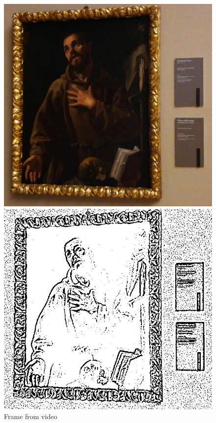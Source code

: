 \begin{figure}[h]
      \includegraphics[width=\linewidth]{pictures/painting_detection/Frame.png}
      \caption*{Frame from video}\label{fig:Frame}
    \endminipage\hfill
      \includegraphics[width=\linewidth]{pictures/painting_detection/2-adaptive_threshold.PNG}

\end{figure}
